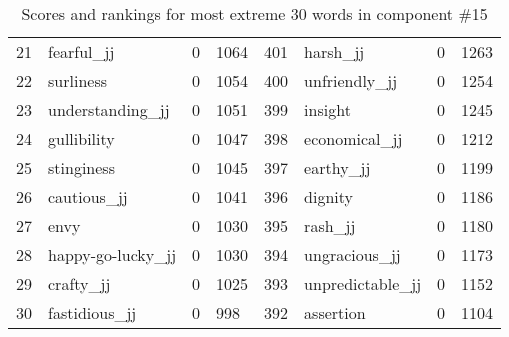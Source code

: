 \begin{table}[tbp]
\begin{tabular}{| rlr@{.}l | rlr@{.}l |}
    21 & fearful\_jj & 0 & 1064    &    401 & harsh\_jj & 0 & 1263 \\
    22 & surliness & 0 & 1054    &    400 & unfriendly\_jj & 0 & 1254 \\
    23 & understanding\_jj & 0 & 1051    &    399 & insight & 0 & 1245 \\
    24 & gullibility & 0 & 1047    &    398 & economical\_jj & 0 & 1212 \\
    25 & stinginess & 0 & 1045    &    397 & earthy\_jj & 0 & 1199 \\
    26 & cautious\_jj & 0 & 1041    &    396 & dignity & 0 & 1186 \\
    27 & envy & 0 & 1030    &    395 & rash\_jj & 0 & 1180 \\
    28 & happy-go-lucky\_jj & 0 & 1030    &    394 & ungracious\_jj & 0 & 1173 \\
    29 & crafty\_jj & 0 & 1025    &    393 & unpredictable\_jj & 0 & 1152 \\
    30 & fastidious\_jj & 0 & 998    &    392 & assertion & 0 & 1104 \\
    \hline
    \end{tabular}
    \caption{Scores and rankings for most extreme 30 words in component \#15} 
\end{table}
\clearpage
